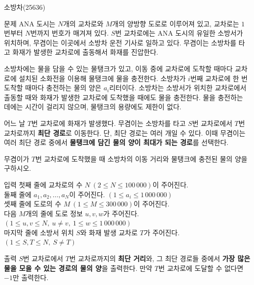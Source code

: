 
\begin{frame}[label=p3]{소방차(25636)}

\tiny

\begin{block}{문제}
ANA 도시는 $N$개의 교차로와 $M$개의 양방향 도로로 이루어져 있고, 교차로는 $1$번부터 $N$번까지 번호가 매겨져 있다. $S$번 교차로에는 ANA 도시의 유일한 소방서가 위치하며, 무겸이는 이곳에서 소방차 운전 기사로 일하고 있다. 무겸이는 소방차를 타고 화재가 발생한 교차로에 출동해서 화재를 진압한다.

소방차에는 물을 담을 수 있는 물탱크가 있고, 이동 중에 교차로에 도착할 때마다 교차로에 설치된 소화전을 이용해 물탱크에 물을 충전한다. 소방차가 $i$번째 교차로에 한 번 도착할 때마다 충전하는 물의 양은 $a_i$리터이다. 소방차는 소방서가 위치한 교차로에서 출동할 때와 화재가 발생한 교차로에 도착했을 때에도 물을 충전한다. 물을 충전하는 데에는 시간이 걸리지 않으며, 물탱크의 용량에도 제한이 없다.

어느 날 $T$번 교차로에 화재가 발생했다. 무겸이는 소방차를 타고 $S$번 교차로에서 $T$번 교차로까지 \textbf{최단 경로}로 이동한다. 단, 최단 경로는 여러 개일 수 있다. 이때 무겸이는 여러 최단 경로 중에서 \textbf{물탱크에 담긴 물의 양이 최대가 되는 경로}를 선택한다.

무겸이가 $T$번 교차로에 도착했을 때 소방차의 이동 거리와 물탱크에 충전된 물의 양을 구하시오.
\end{block}

\begin{block}{입력}
첫째 줄에 교차로의 수 $N\ (2 \le N \le 100\,000)$이 주어진다. \\ 
둘째 줄에 $a_1, a_2, \dots, a_N$이 주어진다. $(1 \le a_i \le 1\,000\,000)$\\ 
셋째 줄에 도로의 수 $M\ (1 \le M \le 300\,000)$이 주어진다.\\ 
다음 $M$개의 줄에 도로 정보 $u, v, w$가 주어진다. $(1 \le u,v \le N,\ u \ne v,\ 1 \le w \le 1\,000\,000)$\\ 
마지막 줄에 소방서 위치 $S$와 화재 발생 교차로 $T$가 주어진다. $(1 \le S,T \le N,\ S \ne T)$\\
\end{block}

\begin{block}{출력}
$S$번 교차로에서 $T$번 교차로까지의 \textbf{최단 거리}와, 그 최단 경로들 중에서 \textbf{가장 많은 물을 모을 수 있는 경로의 물의 양}을 출력한다.  
만약 $T$번 교차로에 도달할 수 없다면 $-1$만 출력한다.
\end{block}

\end{frame}

